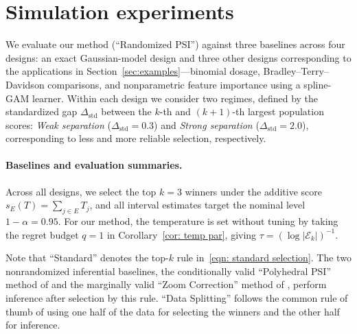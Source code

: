 \documentclass[12pt]{article}
\newcommand{\Ek}{\mathcal{E}_{k}}      %
\begin{document}



\section{Simulation experiments}
\label{sec:simulations}

We evaluate our method (``Randomized PSI'') against three baselines across four designs: an exact Gaussian-model design and three other designs corresponding to the applications in Section~\ref{sec:examples}—binomial dosage, Bradley--Terry--Davidson comparisons, and nonparametric feature importance using a spline-GAM learner.
Within each design we consider two regimes, defined by the standardized gap $\Delta_{\mathrm{std}}$ between the $k$-th and $(k{+}1)$-th largest population scores: \emph{Weak separation} ($\Delta_{\mathrm{std}}=0.3$) and \emph{Strong separation} ($\Delta_{\mathrm{std}}=2.0$), corresponding to less and more reliable selection, respectively.


\paragraph{Baselines and evaluation summaries.}
Across all designs, we select the top $k=3$ winners under the additive score $s_E(T)=\sum_{j\in E}T_j$, and all interval estimates target the nominal level $1-\alpha=0.95$. For our method, the temperature is set without tuning by taking the regret budget $q=1$ in Corollary~\ref{cor: temp par}, giving $\tau=(\log|\Ek|)^{-1}$.


Note that ``Standard'' denotes the top-$k$ rule in~\eqref{eqn: standard selection}. The two nonrandomized inferential baselines, the conditionally valid  ``Polyhedral PSI'' method of \citet{reid2017post} and the marginally valid ``Zoom Correction'' method of \citet{zrnic2025flexible}, perform inference after selection by this rule. ``Data Splitting'' follows the common rule of thumb of using one half of the data for selecting the winners and the other half for inference.
\end{document}
